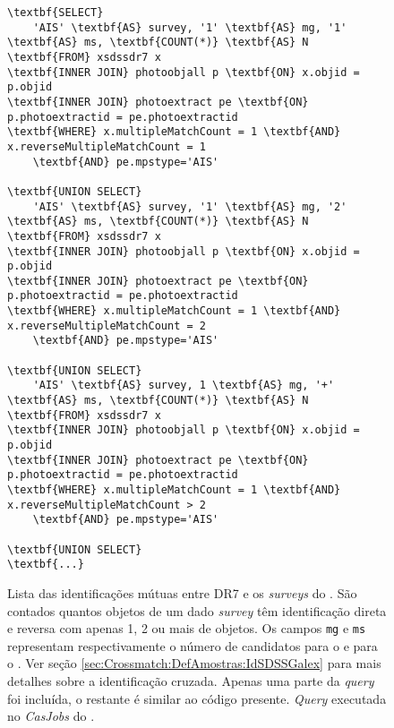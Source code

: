 \begin{figure}
\begin{Verbatim}[frame=single,commandchars=\\\{\}]
\textbf{SELECT}
	'AIS' \textbf{AS} survey, '1' \textbf{AS} mg, '1' \textbf{AS} ms, \textbf{COUNT(*)} \textbf{AS} N
\textbf{FROM} xsdssdr7 x
\textbf{INNER JOIN} photoobjall p \textbf{ON} x.objid = p.objid 
\textbf{INNER JOIN} photoextract pe \textbf{ON} p.photoextractid = pe.photoextractid
\textbf{WHERE} x.multipleMatchCount = 1 \textbf{AND} x.reverseMultipleMatchCount = 1
	\textbf{AND} pe.mpstype='AIS'

\textbf{UNION SELECT}
	'AIS' \textbf{AS} survey, '1' \textbf{AS} mg, '2' \textbf{AS} ms, \textbf{COUNT(*)} \textbf{AS} N
\textbf{FROM} xsdssdr7 x
\textbf{INNER JOIN} photoobjall p \textbf{ON} x.objid = p.objid 
\textbf{INNER JOIN} photoextract pe \textbf{ON} p.photoextractid = pe.photoextractid
\textbf{WHERE} x.multipleMatchCount = 1 \textbf{AND} x.reverseMultipleMatchCount = 2
	\textbf{AND} pe.mpstype='AIS'

\textbf{UNION SELECT}
	'AIS' \textbf{AS} survey, 1 \textbf{AS} mg, '+' \textbf{AS} ms, \textbf{COUNT(*)} \textbf{AS} N
\textbf{FROM} xsdssdr7 x
\textbf{INNER JOIN} photoobjall p \textbf{ON} x.objid = p.objid 
\textbf{INNER JOIN} photoextract pe \textbf{ON} p.photoextractid = pe.photoextractid
\textbf{WHERE} x.multipleMatchCount = 1 \textbf{AND} x.reverseMultipleMatchCount > 2
	\textbf{AND} pe.mpstype='AIS'

\textbf{UNION SELECT}
\textbf{...}
\end{Verbatim}
	\caption[{\em Query} listando identificações entre \SDSS e {\em surveys} do
	\galex.] {Lista das identificações mútuas entre \SDSS DR7 e os {\em surveys}
	do \galex. São contados quantos objetos de um dado {\em survey} têm
	identificação direta e reversa com apenas 1, 2 ou mais de objetos. Os campos
	\texttt{mg} e \texttt{ms} representam respectivamente o número de candidatos
	para o \galex e para o \SDSS. Ver seção
	\ref{sec:Crossmatch:DefAmostras:IdSDSSGalex} para mais detalhes sobre a
	identificação cruzada. Apenas uma parte da {\em query} foi incluída, o
	restante é similar ao código presente. {\em Query} executada no {\em CasJobs}
	do \galex.}
	\label{fig:QueryIDGalexSDSS}
\end{figure}


